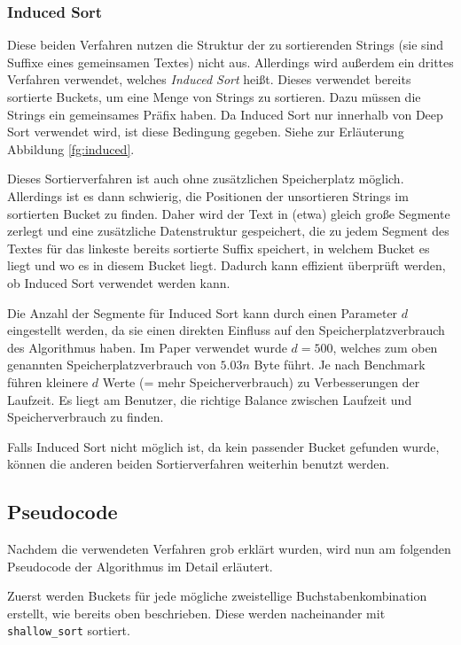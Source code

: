 \subsubsection{Induced Sort}

Diese beiden Verfahren nutzen die Struktur der zu sortierenden Strings
(sie sind Suffixe eines gemeinsamen Textes) nicht aus.
Allerdings wird außerdem ein drittes Verfahren verwendet, welches \textit{Induced Sort} heißt.
Dieses verwendet bereits sortierte Buckets, um eine Menge von Strings zu sortieren.
Dazu müssen die Strings ein gemeinsames Präfix haben.
Da Induced Sort nur innerhalb von Deep Sort verwendet wird, ist diese Bedingung gegeben.
Siehe zur Erläuterung Abbildung \ref{fg:induced}.

Dieses Sortierverfahren ist auch ohne zusätzlichen Speicherplatz möglich.
Allerdings ist es dann schwierig, die Positionen der unsortieren Strings im sortierten Bucket zu finden.
Daher wird der Text in (etwa) gleich große Segmente zerlegt und eine zusätzliche Datenstruktur gespeichert,
die zu jedem Segment des Textes für das linkeste bereits sortierte Suffix speichert,
in welchem Bucket es liegt und wo es in diesem Bucket liegt.
Dadurch kann effizient überprüft werden, ob Induced Sort verwendet werden kann.

Die Anzahl der Segmente für Induced Sort kann durch einen Parameter $d$ eingestellt werden,
da sie einen direkten Einfluss auf den Speicherplatzverbrauch des Algorithmus haben.
Im Paper verwendet wurde $d = 500$, welches zum oben genannten Speicherplatzverbrauch von $5.03n$ Byte führt.
Je nach Benchmark führen kleinere $d$ Werte (= mehr Speicherverbrauch) zu Verbesserungen der Laufzeit.
Es liegt am Benutzer, die richtige Balance zwischen Laufzeit und Speicherverbrauch zu finden.

Falls Induced Sort nicht möglich ist, da kein passender Bucket gefunden wurde,
können die anderen beiden Sortierverfahren weiterhin benutzt werden.

\subsection{Pseudocode}
Nachdem die verwendeten Verfahren grob erklärt wurden,
wird nun am folgenden Pseudocode der Algorithmus im Detail erläutert.

Zuerst werden Buckets für jede mögliche zweistellige Buchstabenkombination erstellt, wie bereits oben beschrieben.
Diese werden nacheinander mit\\
\texttt{shallow\_sort} sortiert.

